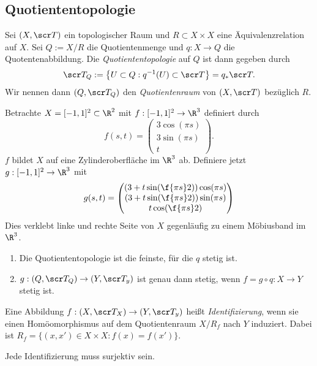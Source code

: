 \subsection{Quotiententopologie}

\begin{df}
	Sei $(X, \scr T)$ ein topologischer Raum und $R \subset X \times X$ eine Äquivalenzrelation auf $X$.
	Sei $Q := X / R$ die Quotientenmenge und $q: X \to Q$ die Quotentenabbildung.
	Die \emph{Quotiententopologie} auf $Q$ ist dann gegeben durch
	\[
		\scr T_Q
		:= \big\{ U \subset Q : q^{-1}(U) \subset \scr T \big\}
		= q_* \scr T.
	\]
	Wir nennen dann $(Q, \scr T_Q)$ den \emph{Quotientenraum} von $(X, \scr T)$ bezüglich $R$.
\end{df}

\begin{ex}
	Betrachte $X = [-1,1]^2 \subset \R^2$ mit $f: [-1,1]^2 \to \R^3$ definiert durch
	\[
		f(s, t) = \begin{pmatrix}
			3 \cos(\pi s) \\
			3 \sin(\pi s) \\
			t
		\end{pmatrix}.
	\]
	$f$ bildet $X$ auf eine Zylinderoberfläche im $\R^3$ ab.
	Definiere jetzt $g: [-1,1]^2 \to \R^3$ mit
	\[
		g(s, t) = \begin{pmatrix}
			(3 + t \sin(\f{\pi s}2)) \cos (\pi s) \\
			(3 + t \sin(\f{\pi s}2)) \sin (\pi s) \\
			t \cos(\f {\pi s}2)
		\end{pmatrix}
	\]
	Dies verklebt linke und rechte Seite von $X$ gegenläufig zu einem Möbiusband im $\R^3$.
\end{ex}

\begin{st}
	\begin{enumerate}[(1)]
		\item
			Die Quotiententopologie ist die feinste, für die $q$ stetig ist.
		\item
			$g: (Q, \scr T_Q) \to (Y, \scr T_y)$ ist genau dann stetig, wenn $f = g \circ q: X \to Y$ stetig ist.
	\end{enumerate}
\end{st}

\begin{df}
	Eine Abbildung $f: (X, \scr T_X) \to (Y, \scr T_y)$ heißt \emph{Identifizierung}, wenn sie einen Homöomorphismus auf dem Quotientenraum $X / R_f$ nach $Y$ induziert.
	Dabei ist $R_f = \{ (x,x') \in X \times X : f(x) = f(x') \}$.
	\begin{note}
		Jede Identifizierung muss surjektiv sein.
	\end{note}
\end{df}

